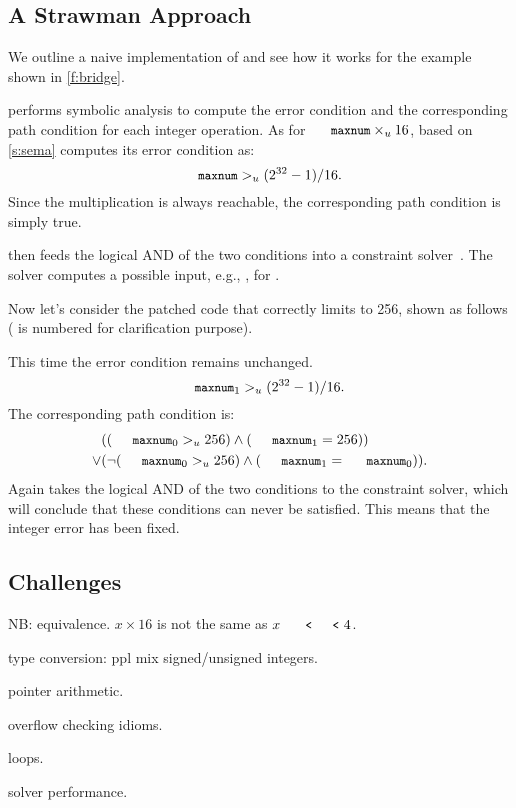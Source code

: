 \subsection{A Strawman Approach}

We outline a naive implementation of \sys and see how it works
for the example shown in \autoref{f:bridge}.

\sys performs symbolic analysis to compute the error condition and
the corresponding path condition for each integer operation.  As
for $\cc{maxnum} \times_u 16$, based on \autoref{s:sema}
\sys computes its error condition as:
\begin{equation*}
\cc{maxnum} >_u (2^{32} - 1) / 16.
\end{equation*}
Since the multiplication is always reachable, the corresponding
path condition is simply true.

\sys then feeds the logical AND of the two conditions into a
constraint solver~\cite{boolector}.  The solver computes a possible
input, e.g., , for .

Now let's consider the patched code that correctly limits 
to 256, shown as follows ( is numbered for clarification
purpose).

This time the error condition remains unchanged.
\begin{equation*}
\cc{maxnum}_1 >_u (2^{32} - 1) / 16.
\end{equation*}
The corresponding path condition is:
\begin{align*}
& ((\cc{maxnum}_0 >_u 256) \land (\cc{maxnum}_1 = 256)) \\
\lor
& (\neg (\cc{maxnum}_0 >_u 256) \land (\cc{maxnum}_1 = \cc{maxnum}_0)).
\end{align*}
Again \sys takes the logical AND of the two conditions to the
constraint solver, which will conclude that these conditions can
never be satisfied.  This means that the integer error has been
fixed.

\subsection{Challenges}

NB: equivalence.
$x \times 16$ is not the same as $x \shl 4$.

type conversion: ppl mix signed/unsigned integers.

pointer arithmetic.

overflow checking idioms.

loops.

solver performance.
